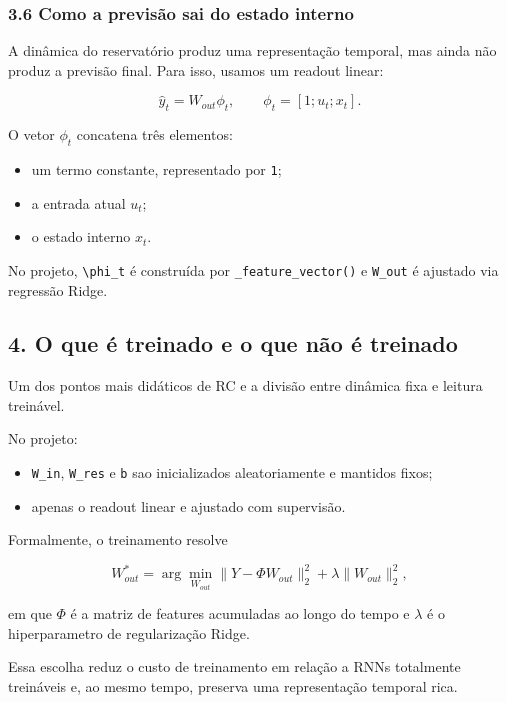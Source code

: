 \documentclass[12pt]{article}
\providecommand{\tightlist}{%
          \setlength{\itemsep}{0pt}\setlength{\parskip}{0pt}}
\begin{document}
\subsubsection{3.6 Como a previsão sai do estado interno}\label{36-como-a-previsuxe3o-sai-do-estado-interno}

A dinâmica do reservatório produz uma representação temporal, mas ainda não produz a previsão final. Para isso, usamos um readout linear:

\[
\hat{y}_t = W_{out} \phi_t,
\qquad
\phi_t = [1; u_t; x_t].
\]

O vetor \(\phi_t\) concatena três elementos:

\begin{itemize}
\tightlist
\item
  um termo constante, representado por \texttt{1};
\item
  a entrada atual \(u_t\);
\item
  o estado interno \(x_t\).
\end{itemize}

No projeto, \texttt{\textbackslash{}phi\_t} é construída por \texttt{\_feature\_vector()} e \texttt{W\_out} é ajustado via regressão Ridge.

\subsection{4. O que é treinado e o que não é treinado}\label{4-o-que-uxe9-treinado-e-o-que-nuxe3o-uxe9-treinado}

Um dos pontos mais didáticos de RC e a divisão entre dinâmica fixa e leitura treinável.

No projeto:

\begin{itemize}
\tightlist
\item
  \texttt{W\_in}, \texttt{W\_res} e \texttt{b} sao inicializados aleatoriamente e mantidos fixos;
\item
  apenas o readout linear e ajustado com supervisão.
\end{itemize}

Formalmente, o treinamento resolve

\[
W_{out}^* = \arg\min_{W_{out}}
\|Y - \Phi W_{out}\|_2^2 + \lambda \|W_{out}\|_2^2,
\]

em que \(\Phi\) é a matriz de features acumuladas ao longo do tempo e \(\lambda\) é o hiperparametro de regularização Ridge.

Essa escolha reduz o custo de treinamento em relação a RNNs totalmente treináveis e, ao mesmo tempo, preserva uma representação temporal rica.
\end{document}
